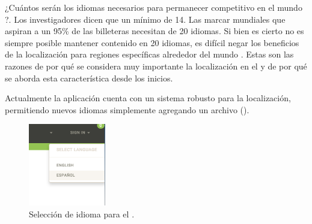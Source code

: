 ¿Cuántos serán los idiomas necesarios para permanecer competitivo en el mundo \online?. Los investigadores dicen que un mínimo de 14. Las marcar mundiales que aspiran a un 95\% de las billeteras \online necesitan de 20 idiomas. Si bien es cierto no es siempre posible mantener contenido \online en 20 idiomas, es difícil negar los beneficios de la localización para regiones específicas alrededor del mundo \cite{online_world_global_oportunity_multi_languages}. Estas son las razones de por qué se considera muy importante la localización en el \frameworkPC y de por qué se aborda esta característica desde los inicios.

Actualmente la aplicación cuenta con un sistema robusto para la localización, permitiendo nuevos idiomas simplemente agregando un archivo \jsonNAME ().


\begin{figure}[H]
	\centering
	\includegraphics[width=0.3\textwidth]{figuras/languages_available.png}

	\caption{Selección de idioma para el \websiteINT.}
	\label{figure:features:languages_available}
\end{figure}


